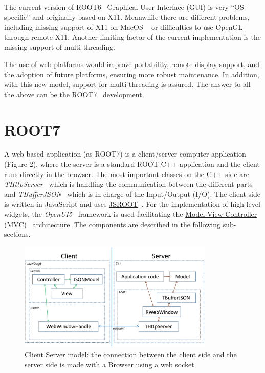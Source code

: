 \documentclass[a4paper]{jpconf}
\begin{document}
The current version of ROOT6~\cite{root6} Graphical User Interface (GUI) is very ``OS-specific'' and originally based on X11.
Meanwhile there are different problems, including missing support of X11 on MacOS ~\cite{x11} or difficulties to use OpenGL through remote X11.
Another limiting factor of the current implementation is the missing support of multi-threading.

The use of web platforms would improve portability, remote display support, and the adoption of future platforms, ensuring more robust maintenance. In addition, with this new model, support for multi-threading is assured.
The answer to all the above can be the \href{https://root.cern/root-7}{ROOT7}~\cite{root7} development.

\section{ROOT7}

A web based application (as ROOT7) is a client/server computer application (Figure 2),
where the server is a standard ROOT C++ application and the client runs directly in the browser.
The most important classes on the C++ side are {\it THttpServer}~\cite{http} which is handling
the communication between the different parts and \textit{TBufferJSON}~\cite{buffer}
which is in charge of the Input/Output (I/O). The client side is written in JavaScript and uses \href{https://root.cern/js/}{JSROOT}~\cite{jsroot}.
For the implementation of high-level widgets, the \textit{OpenUI5}~\cite{openui} framework is used facilitating the
\href{https://en.wikipedia.org/wiki/Model%E2%80%93view%E2%80%93controller}{Model-View-Controller (MVC)}~\cite{mvc}
architecture. The components are described in the following sub-sections.

\begin{figure}[h]
  \begin{center}
    \includegraphics[width=22pc]{figure2.eps}\hspace{2pc}%
  \end{center}
  \centering
\begin{minipage}[b]{20pc}\caption{\label{label}Client Server model: the connection between the client side and the server side is made with a Browser using a web socket}
\end{minipage}
\end{figure}
\end{document}
